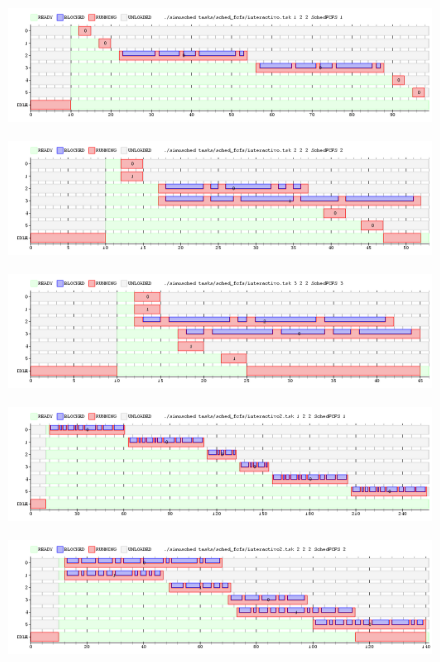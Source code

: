 \documentclass[11pt, a4paper, twoside]{article}
\begin{document}
\begin{figure}[H]
  \includegraphics [width=\textwidth]{../graficos/sched_fcfs/interactivo.png}
  \caption{}
\end{figure}
\begin{figure}[H]
  \includegraphics [width=\textwidth]{../graficos/sched_fcfs/interactivo_2.png}
  \caption{}
\end{figure}
\begin{figure}[H]
  \includegraphics [width=\textwidth]{../graficos/sched_fcfs/interactivo_3.png}
  \caption{}
\end{figure}
\begin{figure}[H]
  \includegraphics [width=\textwidth]{../graficos/sched_fcfs/interactivo2.png}
  \caption{}
\end{figure}
\begin{figure}[H]
  \includegraphics [width=\textwidth]{../graficos/sched_fcfs/interactivo2_2.png}
  \caption{}
\end{figure}
\end{document}
